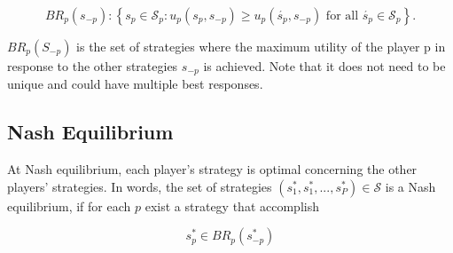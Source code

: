\begin{equation*}
    BR_p(s_{-p}) : \left\{ s_p \in \mathcal{S}_{p} : u_p(s_{p},s_{-p}) \ge u_p(\acute{s_{p}},s_{-p}) \text{ for all } \acute{s_{p}} \in \mathcal{S}_{p} \right\} .
\end{equation*}

$BR_p(S_{-p})$ is the set of strategies where the maximum utility of the player p in response to the other strategies $s_{-p}$ is achieved. Note that it does not need to be unique and could have multiple best responses.


\subsection{Nash Equilibrium}


At Nash equilibrium, each player's strategy is optimal concerning the other players' strategies. In words, the set of strategies $(s_1^*,s_1^*, ... ,s_P^*) \in \mathcal{S}$ is a Nash equilibrium, if for each $p$ exist a strategy that accomplish 

\begin{equation*}
    s_p^* \in BR_p(s^*_{-p})
\end{equation*}


